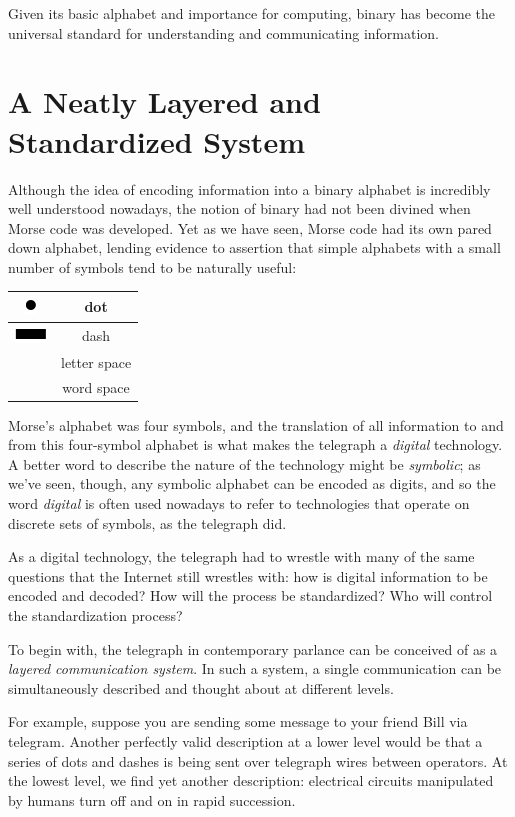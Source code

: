 \documentclass[UTF8]{book}
\newcommand*\thickdash{\includegraphics{thick-dash2}}
\newcommand*\thickdot{\includegraphics{thick-dot2}}
\begin{document}
\begin{CJK}{UTF8}{gbsn}
Given its basic alphabet and importance for computing, binary has become the universal standard for understanding and communicating information.

\section{A Neatly Layered and Standardized System}

Although the idea of encoding information into a binary alphabet is incredibly well understood nowadays, the notion of binary had not been divined when Morse code was developed. Yet as we have seen, Morse code had its own pared down alphabet, lending evidence to assertion that simple alphabets with a small number of symbols tend to be naturally useful:

\begin{center}
\begin{tabular}{cc}
\thickdot & dot \\
\hline
\thickdash & dash \\
\hline
[short pause] & letter space \\
\hline
[long pause] & word space \\
\end{tabular}
\end{center}

Morse's alphabet was four symbols, and the translation of all information to and from this four-symbol alphabet is what makes the telegraph a \emph{digital} technology. A better word to describe the nature of the technology might be \emph{symbolic}; as we've seen, though, any symbolic alphabet can be encoded as digits, and so the word \emph{digital} is often used nowadays to refer to technologies that operate on discrete sets of symbols, as the telegraph did.

As a digital technology, the telegraph had to wrestle with many of the same questions that the Internet still wrestles with: how is digital information to be encoded and decoded? How will the process be standardized? Who will control the standardization process?

To begin with, the telegraph in contemporary parlance can be conceived of as a \emph{layered communication system}. In such a system, a single communication can be simultaneously described and thought about at different levels.

For example, suppose you are sending some message to your friend Bill via telegram. Another perfectly valid description at a lower level would be that a series of dots and dashes is being sent over telegraph wires between operators. At the lowest level, we find yet another description: electrical circuits manipulated by humans turn off and on in rapid succession.


\end{CJK}
\end{document}

